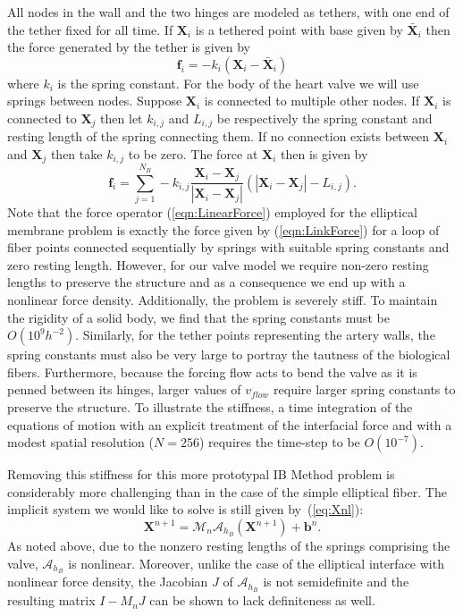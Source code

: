 \documentclass[preprint,12pt]{elsarticle}
\begin{document}
All nodes in the wall and the two hinges are modeled as tethers, with one end of the tether fixed for all time. If $\mathbf{X}_i$ is a tethered point with base given by $\bar{\mathbf{X}}_i$ then the force generated by the tether is given by 
\begin{equation}
\mathbf{f}_i = -k_i (\mathbf{X}_i-\bar{\mathbf{X}}_i)
\label{eqn:TetherForce}
\end{equation}
where $k_i$ is the spring constant. For the body of the heart valve we will use springs between nodes. Suppose $\mathbf{X}_i$ is connected to multiple other nodes. If $\mathbf{X}_i$ is connected to $\mathbf{X}_j$ then let $k_{i,j}$ and $L_{i,j}$ be respectively the spring constant and resting length of the spring connecting them. If no connection exists between $\mathbf{X}_i$ and $\mathbf{X}_j$ then take $k_{i,j}$ to be zero. The force at $\mathbf{X}_i$ then is given by
\begin{equation}
\mathbf{f}_i = \sum_{j=1}^{N_B} -k_{i,j} \frac{\mathbf{X}_i-\mathbf{X}_j}{|\mathbf{X}_i-\mathbf{X}_j|}
(|\mathbf{X}_i-\mathbf{X}_j| - L_{i,j}).
\label{eqn:LinkForce}
\end{equation}
Note that the force operator (\ref{eqn:LinearForce}) employed for the elliptical membrane problem 
is exactly the force given by (\ref{eqn:LinkForce}) for a loop of fiber points connected sequentially by springs with suitable spring constants and zero resting length. 
However, for our valve model we require non-zero resting lengths to preserve the structure and as a consequence we end up with a nonlinear force density.
Additionally, the problem is severely stiff. To maintain the rigidity of a solid body,  we find that the
 spring constants must be $O(10^9h^{-2})$. Similarly, for the tether points representing the artery walls, the spring constants must also be very large to portray the tautness of the biological fibers. Furthermore, because the forcing flow acts to bend the valve as it is penned between its hinges,  larger values of $v_{flow}$ require larger spring constants to preserve the structure. 
To illustrate the stiffness, a time integration of the equations of motion with an explicit treatment 
of the interfacial force and with a modest spatial resolution ($N=256$) requires the time-step to be 
$O(10^{-7})$.  

 Removing this stiffness for this more prototypal IB Method problem is considerably  more challenging than in the case of the simple elliptical fiber. The implicit system we would like to solve is still given 
 by~(\ref{eq:Xnl}):
$$
\mathbf{X}^{n+1} = \mathcal{M}_n\mathcal{A}_{h_B} (\mathbf{X}^{n+1}) + \mathbf{b}^n.
$$
As noted above, due to the nonzero resting lengths of the springs comprising the valve, 
$\mathcal{A}_{h_B}$ is nonlinear. Moreover, unlike the case of the elliptical interface with
nonlinear force density,  the Jacobian $J$ of $\mathcal{A}_{h_B}$ is not semidefinite and the resulting matrix $I - M_nJ$ can be shown to lack definiteness as well.
\end{document}
